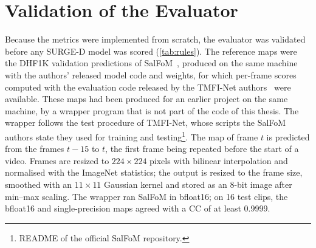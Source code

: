 \section{Validation of the Evaluator}\label{sec:metric-validation}

Because the metrics were implemented from scratch, the evaluator was
validated before any SURGE-D model was scored (\cref{tab:rules}). The
reference maps were the DHF1K validation predictions of
SalFoM~\cite{moradi2024salfom}, produced on the same machine with the authors'
released model code and weights, for which per-frame scores computed with the
evaluation code released by the TMFI-Net authors~\cite{zhou2023transformer}
were available. These maps had been produced for an earlier project on the
same machine, by a wrapper program that is not part of the code of this thesis.
The wrapper follows the test procedure of TMFI-Net, whose scripts the SalFoM
authors state they used for training and testing\footnote{README of the
official SalFoM repository.}. The map of frame $t$ is predicted from the
frames $t-15$ to $t$, the first frame being repeated before the start of a
video. Frames are resized to $224\times224$ pixels with bilinear interpolation
and normalised with the ImageNet statistics; the output is resized to the
frame size, smoothed with an $11\times11$ Gaussian kernel and stored as an
8-bit image after min--max scaling. The wrapper ran SalFoM in bfloat16; on 16
test clips, the bfloat16 and single-precision maps agreed with a \acrshort{CC}
of at least 0.9999.

